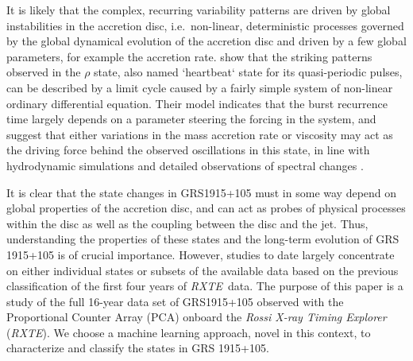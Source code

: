 \documentclass[fleqn,usenatbib]{mnras}
\newcommand{\project}[1]{\textsl{#1}}
\newcommand{\rxte}{\project{RXTE}}
\begin{document}
It is likely that the complex, recurring variability patterns are driven by global instabilities in the accretion disc, i.e.\ non-linear, deterministic processes governed by the global dynamical evolution of the accretion disc and driven by a few global parameters, for example the accretion rate. \citet{massaro2014} show that the striking patterns observed in the $\rho$ state, also named `heartbeat` state for its quasi-periodic pulses, can be described by a limit cycle caused by a fairly simple system of non-linear ordinary differential equation. Their model indicates that the burst recurrence time largely depends on a parameter steering the forcing in the system, and suggest that either variations in the mass accretion rate or viscosity may act as the driving force behind the observed oscillations in this state, in line with hydrodynamic simulations \citep{nayakshin2000, merloni2006} and detailed observations of spectral changes \citep{neilsen2011, neilsen2012}.

It is clear that the state changes in GRS1915+105 must in some way depend on global properties of the accretion disc, and can act as probes of physical processes within the disc as well as the coupling between the disc and the jet. Thus, understanding the properties of these states and the long-term evolution of GRS 1915+105 is of crucial importance. However, studies to date largely concentrate on either individual states or subsets of the available data based on the previous classification of the first four years of \rxte\ data. 
The purpose of this paper is a study of the full 16-year data set of GRS1915+105 observed with the Proportional Counter Array (PCA) onboard the \textit{Rossi X-ray Timing Explorer} (\rxte). We choose a machine learning approach, novel in this context, to characterize and classify the states in GRS 1915+105. 
\end{document}
